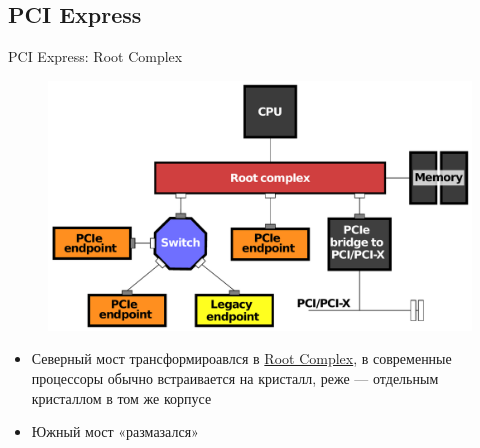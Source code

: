 \documentclass[xetex,aspectratio=43]{beamer}
\begin{document}
\subsection{PCI Express}

\begin{frame}{PCI Express: Root Complex}
	\begin{figure}
        \includegraphics[height=0.5\textheight]{img/03.Example_PCI_Express_Topology.pdf}
    \end{figure}
    \begin{itemize}
        \item Северный мост трансформироавлся в \href{https://en.wikipedia.org/wiki/Root_complex}{Root Complex}, в современные процессоры обычно встраивается на кристалл, реже --- отдельным кристаллом в том же корпусе
        \item Южный мост «размазался»
    \end{itemize}
\end{frame}
\end{document}
